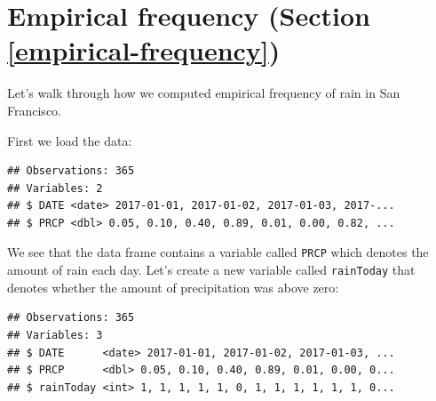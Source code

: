 \documentclass[12pt,]{book}
\newenvironment{Shaded}{\begin{snugshade}}{\end{snugshade}}
\newcommand{\CommentTok}[1]{\textcolor[rgb]{0.56,0.35,0.01}{\textit{#1}}}
\newcommand{\DataTypeTok}[1]{\textcolor[rgb]{0.13,0.29,0.53}{#1}}
\newcommand{\DecValTok}[1]{\textcolor[rgb]{0.00,0.00,0.81}{#1}}
\newcommand{\KeywordTok}[1]{\textcolor[rgb]{0.13,0.29,0.53}{\textbf{#1}}}
\newcommand{\NormalTok}[1]{#1}
\newcommand{\OperatorTok}[1]{\textcolor[rgb]{0.81,0.36,0.00}{\textbf{#1}}}
\newcommand{\StringTok}[1]{\textcolor[rgb]{0.31,0.60,0.02}{#1}}
\begin{document}
\hypertarget{empirical-frequency-section-refempirical-frequency}{%
\section{Empirical frequency (Section \ref{empirical-frequency})}\label{empirical-frequency-section-refempirical-frequency}}

Let's walk through how we computed empirical frequency of rain in San Francisco.

First we load the data:

\begin{Shaded}
\end{Shaded}

\begin{verbatim}
## Observations: 365
## Variables: 2
## $ DATE <date> 2017-01-01, 2017-01-02, 2017-01-03, 2017-...
## $ PRCP <dbl> 0.05, 0.10, 0.40, 0.89, 0.01, 0.00, 0.82, ...
\end{verbatim}

We see that the data frame contains a variable called \texttt{PRCP} which denotes the amount of rain each day. Let's create a new variable called \texttt{rainToday} that denotes whether the amount of precipitation was above zero:

\begin{Shaded}
\end{Shaded}

\begin{verbatim}
## Observations: 365
## Variables: 3
## $ DATE      <date> 2017-01-01, 2017-01-02, 2017-01-03, ...
## $ PRCP      <dbl> 0.05, 0.10, 0.40, 0.89, 0.01, 0.00, 0...
## $ rainToday <int> 1, 1, 1, 1, 1, 0, 1, 1, 1, 1, 1, 1, 0...
\end{verbatim}
\end{document}
